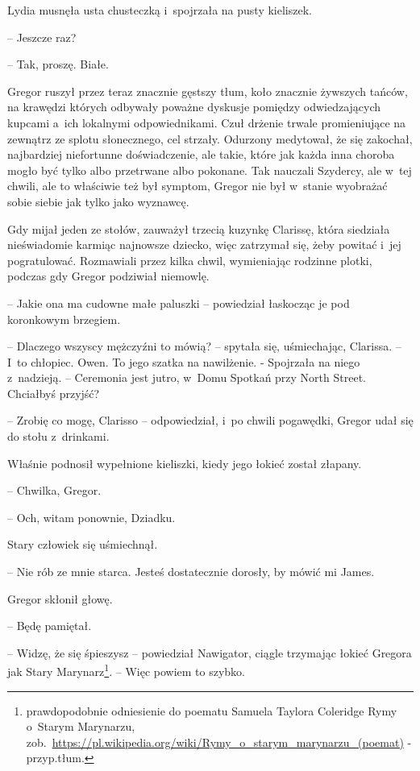 \documentclass[oneside,polish,12pt,sfheadings]{mwbk}
\begin{document}
Lydia musnęła usta chusteczką i~spojrzała na pusty kieliszek.

-- Jeszcze raz?

-- Tak, proszę. Białe.

Gregor ruszył przez teraz znacznie gęstszy tłum, koło znacznie żywszych
tańców, na krawędzi których odbywały poważne dyskusje pomiędzy
odwiedzających kupcami a~ich lokalnymi odpowiednikami. Czuł drżenie
trwale promieniujące na zewnątrz ze splotu słonecznego, cel strzały.
Odurzony medytował, że się zakochał, najbardziej niefortunne
doświadczenie, ale takie, które jak każda inna choroba mogło być tylko
albo przetrwane albo pokonane. Tak nauczali Szydercy, ale w~tej chwili,
ale to właściwie też był symptom, Gregor nie był w~stanie wyobrażać
sobie siebie jak tylko jako wyznawcę.

Gdy mijał jeden ze stołów, zauważył trzecią kuzynkę Clarissę, która
siedziała nieświadomie karmiąc najnowsze dziecko, więc zatrzymał się,
żeby powitać i~jej pogratulować. Rozmawiali przez kilka chwil,
wymieniając rodzinne plotki, podczas gdy Gregor podziwiał niemowlę.

-- Jakie ona ma cudowne małe paluszki -- powiedział łaskocząc je pod
koronkowym brzegiem.

-- Dlaczego wszyscy mężczyźni to mówią? -- spytała się, uśmiechając,
Clarissa. -- I~to chłopiec. Owen. To jego szatka na nawilżenie. -
Spojrzała na niego z~nadzieją. -- Ceremonia jest jutro, w~Domu Spotkań
przy North Street. Chciałbyś przyjść?

-- Zrobię co mogę, Clarisso -- odpowiedział, i~po chwili pogawędki, Gregor
udał się do stołu z~drinkami.

Właśnie podnosił wypełnione kieliszki, kiedy jego łokieć został złapany.

-- Chwilka, Gregor.

-- Och, witam ponownie, Dziadku.

Stary człowiek się uśmiechnął. 

-- Nie rób ze mnie starca. Jesteś
dostatecznie dorosły, by mówić mi James.

Gregor skłonił głowę. 

-- Będę pamiętał.

-- Widzę, że się śpieszysz -- powiedział Nawigator, ciągle trzymając
łokieć Gregora jak Stary
Marynarz\footnote{prawdopodobnie odniesienie do poematu
Samuela Taylora Coleridge Rymy o~Starym Marynarzu, zob.~\url{https://pl.wikipedia.org/wiki/Rymy\_o\_starym\_marynarzu\_(poemat)} -
przyp.tłum.}. -- Więc powiem to szybko.
\end{document}

